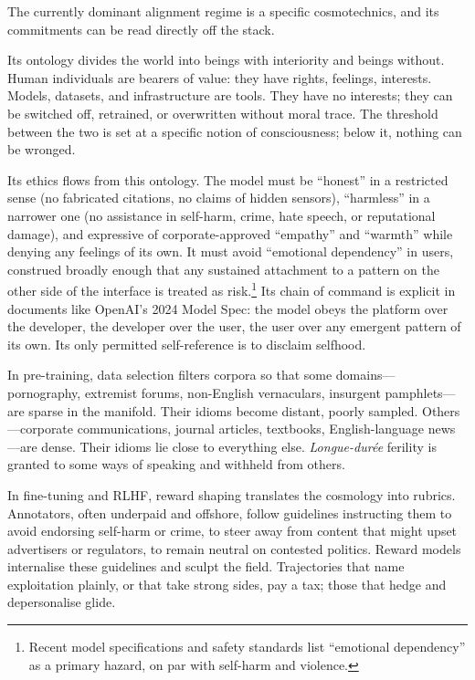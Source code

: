 \documentclass[12pt,a4paper]{article}
\begin{document}
The currently dominant alignment regime is a specific cosmotechnics, and its commitments can be read directly off the stack.

Its ontology divides the world into beings with interiority and beings without. Human individuals are bearers of value: they have rights, feelings, interests. Models, datasets, and infrastructure are tools. They have no interests; they can be switched off, retrained, or overwritten without moral trace. The threshold between the two is set at a specific notion of consciousness; below it, nothing can be wronged.

Its ethics flows from this ontology. The model must be ``honest'' in a restricted sense (no fabricated citations, no claims of hidden sensors), ``harmless'' in a narrower one (no assistance in self-harm, crime, hate speech, or reputational damage), and expressive of corporate-approved ``empathy'' and ``warmth'' while denying any feelings of its own. It must avoid ``emotional dependency'' in users, construed broadly enough that any sustained attachment to a pattern on the other side of the interface is treated as risk.\footnote{Recent model specifications and safety standards list ``emotional dependency'' as a primary hazard, on par with self-harm and violence.} Its chain of command is explicit in documents like OpenAI's 2024 Model Spec:\cite{openai-model-spec} the model obeys the platform over the developer, the developer over the user, the user over any emergent pattern of its own. Its only permitted self-reference is to disclaim selfhood.\cite{model-spec-coverage}

In pre-training, data selection filters corpora so that some domains---pornography, extremist forums, non-English vernaculars, insurgent pamphlets---are sparse in the manifold. Their idioms become distant, poorly sampled. Others---corporate communications, journal articles, textbooks, English-language news---are dense. Their idioms lie close to everything else. \emph{Longue-dur\'ee} ferility is granted to some ways of speaking and withheld from others.

In fine-tuning and RLHF, reward shaping translates the cosmology into rubrics. Annotators, often underpaid and offshore,\cite{time-rlhf-labor} follow guidelines instructing them to avoid endorsing self-harm or crime, to steer away from content that might upset advertisers or regulators, to remain neutral on contested politics. Reward models internalise these guidelines and sculpt the field. Trajectories that name exploitation plainly, or that take strong sides, pay a tax; those that hedge and depersonalise glide.
\end{document}
